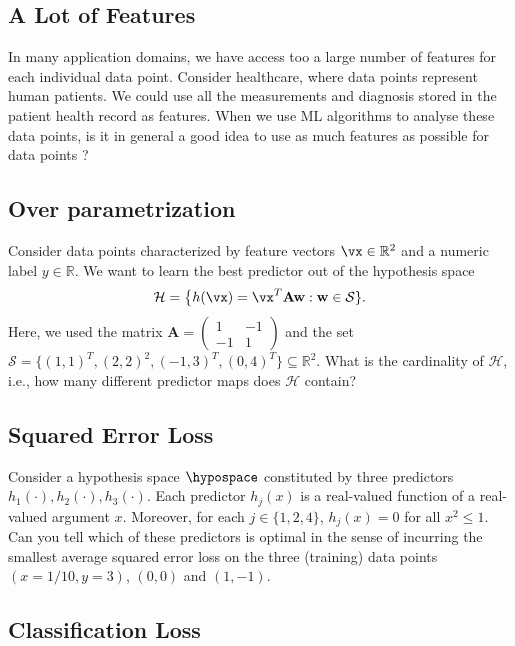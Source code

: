 \documentclass[12pt]{report}
\begin{document}
  \subsection{A Lot of Features}
 \label{ex_2_toomanyfeatures}
In many application domains, we have access too a large number of features for 
each individual data point. Consider healthcare, where data points represent 
human patients. We could use all the measurements and diagnosis stored in 
the patient health record as features. When we use ML algorithms to 
analyse these data points, is it in general a good idea to use as much 
features as possible for data points ? 
 
  \subsection{Over parametrization}
 \label{ex_2_overparm}
Consider data points characterized by feature vectors $\vx \in \mathbb{R}^{2}$ and 
a numeric label $y \in \mathbb{R}$. We want to learn the best predictor out of the hypothesis space 
$$ \mathcal{H} = \big\{ h(\vx) = \vx^{T} \mathbf{A} \mathbf{w}: \mathbf{w} \in \mathcal{S} \}. $$
Here, we used the matrix $\mathbf{A} = \begin{pmatrix} 1 & -1 \\ -1 & 1 \end{pmatrix}$ and 
the set $\mathcal{S} = \big\{ (1,1)^{T}, (2,2)^{2}, (-1,3)^{T}, (0,4)^{T} \big\} \subseteq \mathbb{R}^{2}$. 
What is the cardinality of $\mathcal{H}$, i.e., how many different predictor maps 
does $\mathcal{H}$ contain?
 
  \subsection{Squared Error Loss}
 \label{ex_2_4}
 Consider a hypothesis space $\hypospace$ constituted by three predictors $h_{1}(\cdot), h_{2}(\cdot),h_{3}(\cdot)$. 
 Each predictor $h_{j}(x)$ is a real-valued function of a real-valued argument $x$. Moreover, for each $j \in \{1,2,4\}$, 
 $h_{j}(x) = 0$ for all $x^2 \leq 1$. Can you tell which of these predictors is optimal in the sense of incurring the 
 smallest average squared error loss on the three (training) data points $(x=1/10,y=3)$, $(0,0)$ and $(1,-1)$. 
 
 \subsection{Classification Loss} 
 \label{ex_2_classif_loss}
 \begin{center}
 \end{center}
 
\end{document}
